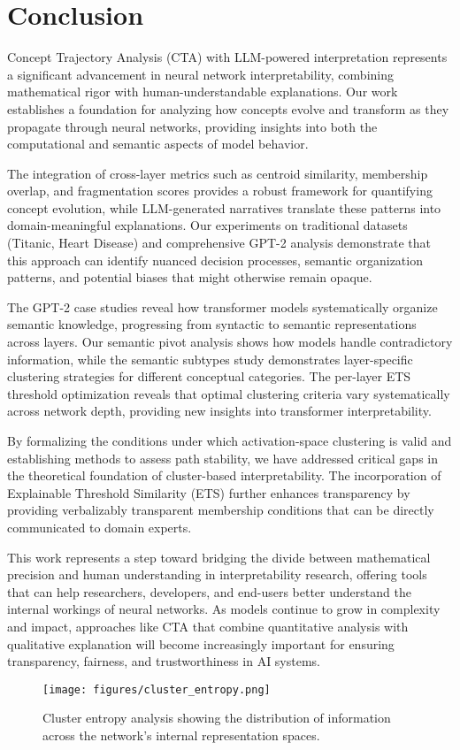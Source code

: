 \section{Conclusion}

Concept Trajectory Analysis (CTA) with LLM-powered interpretation represents a significant advancement in neural network interpretability, combining mathematical rigor with human-understandable explanations. Our work establishes a foundation for analyzing how concepts evolve and transform as they propagate through neural networks, providing insights into both the computational and semantic aspects of model behavior.

The integration of cross-layer metrics such as centroid similarity, membership overlap, and fragmentation scores provides a robust framework for quantifying concept evolution, while LLM-generated narratives translate these patterns into domain-meaningful explanations. Our experiments on traditional datasets (Titanic, Heart Disease) and comprehensive GPT-2 analysis demonstrate that this approach can identify nuanced decision processes, semantic organization patterns, and potential biases that might otherwise remain opaque.

The GPT-2 case studies reveal how transformer models systematically organize semantic knowledge, progressing from syntactic to semantic representations across layers. Our semantic pivot analysis shows how models handle contradictory information, while the semantic subtypes study demonstrates layer-specific clustering strategies for different conceptual categories. The per-layer ETS threshold optimization reveals that optimal clustering criteria vary systematically across network depth, providing new insights into transformer interpretability.

By formalizing the conditions under which activation-space clustering is valid and establishing methods to assess path stability, we have addressed critical gaps in the theoretical foundation of cluster-based interpretability. The incorporation of Explainable Threshold Similarity (ETS) further enhances transparency by providing verbalizably transparent membership conditions that can be directly communicated to domain experts.

This work represents a step toward bridging the divide between mathematical precision and human understanding in interpretability research, offering tools that can help researchers, developers, and end-users better understand the internal workings of neural networks. As models continue to grow in complexity and impact, approaches like CTA that combine quantitative analysis with qualitative explanation will become increasingly important for ensuring transparency, fairness, and trustworthiness in AI systems.

\begin{figure}[ht]
    \centering
    \texttt{[image: figures/cluster\_entropy.png]}
    \caption{Cluster entropy analysis showing the distribution of information across the network's internal representation spaces.}
    \label{fig:cluster_entropy}
\end{figure}